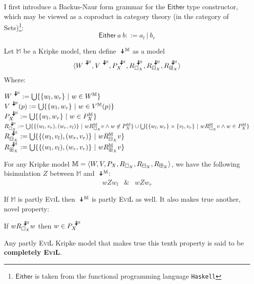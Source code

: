 I first introduce a Backus-Naur form grammar for the $\mathsf{Either}$ type constructor, which may be viewed as a coproduct in category theory (in the category of Sets)\footnote{$\mathsf{Either}$ is taken from the functional programming language \texttt{Haskell}}:
\[ \mathsf{Either}\ a\ b ::= a_l \ |\ b_r \]
\begin{mydef}
Let $\mathbb{M}$ be a Kripke model, then define $\invis^\mathbb{M}$ as a model
\[\la W^{\invis^\mathbb{M}},V^{\invis^\mathbb{M}}, P^{\invis^\mathbb{M}}_X,R^{\invis^\mathbb{M}}_{\Nec_X},R^{\invis^\mathbb{M}}_{\BB_X},R^{\invis^\mathbb{M}}_{\BBI_X}\ra\] 
Where:
\begin{tabbing}
$W^{\invis^\mathbb{M}} := \bigcup\{\{w_l,w_r\}\ |\ w\in W^\mathbb{M}\}$\\
$V^{\invis^\mathbb{M}}(p) := \bigcup\{\{w_l,w_r\}\ |\ w\in V^\mathbb{M}(p)\}$\\
$P^{\invis^\mathbb{M}}_X := \bigcup\{\{w_l,w_r\}\ |\  w\in P^\mathbb{M}_X\}$\\
$R^{\invis^\mathbb{M}}_{\Nec_X} := \bigcup\{\{(w_l,v_r),(w_r,v_l)\}\ |\ w R^\mathbb{M}_{\Nec_X} v \wedge w \nin P^\mathbb{M}_X\} \cup \bigcup\{\{w_l,w_r\}\times \{v_l,v_r\}\ |\ w R^\mathbb{M}_{\Nec_X} v \wedge w \in P^\mathbb{M}_X\}$\\
$R^{\invis^\mathbb{M}}_{\BB_X} := \bigcup\{\{(w_l,v_l),(w_r,v_r)\}\ | \ w R^\mathbb{M}_{\BB_X} v \}$ \\
$R^{\invis^\mathbb{M}}_{\BBI_X} := \bigcup\{\{(w_l,v_l),(w_r,v_r)\}\ | \ w R^\mathbb{M}_{\BBI_X} v \}$
\end{tabbing}

\end{mydef}
\begin{lemma}\label{bisimulation}
For any Kripke model $\mathbb{M} = \langle W,V,P_X,R_{\Box_X},R_{\boxminus_X}, R_{\boxplus_X}\rangle$, we have the following bisimulation $Z$ between $\mathbb{M}$ and $\invis^\mathbb{M}$:
\begin{eqnarray*} w Z w_l & \& & w Z w_r \end{eqnarray*}
\end{lemma}

\begin{lemma}
If $\mathbb{M}$ is partly \textsc{EviL} then $\invis^\mathbb{M}$ is partly \textsc{EviL} as well.  It also makes true another, novel property: 
\begin{mynum}[start=10,resume]
\item If $w R^{\invis^\mathbb{M}}_{\Nec_X} w$ then $w\in P^{\invis^\mathbb{M}}_X$
\end{mynum}
Any partly \textsc{EviL} Kripke model that makes true this tenth property is said to be \textbf{completely \textsc{EviL}}.
\end{lemma}

